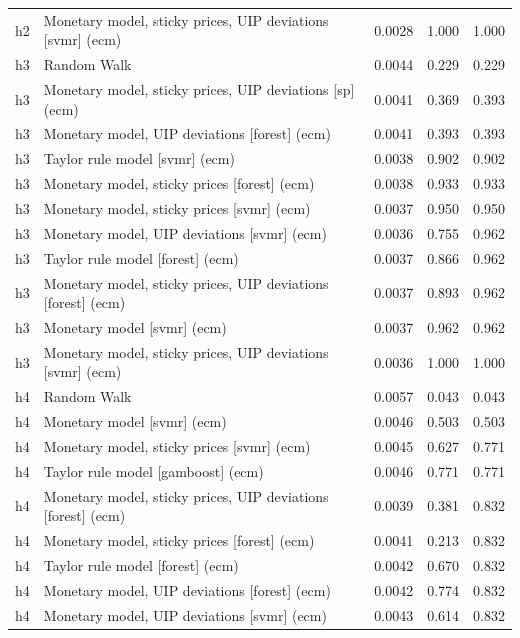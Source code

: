 \begin{ThreePartTable}
\begin{longtable}[t]{cp{5.5cm}ccc}
h2 & \raggedright Monetary model, sticky prices, UIP deviations [svmr] (ecm) & 0.0028 & 1.000 & 1.000\\
\addlinespace
h3 & \raggedright Random Walk & 0.0044 & 0.229 & 0.229\\
h3 & \raggedright Monetary model, sticky prices, UIP deviations [sp] (ecm) & 0.0041 & 0.369 & 0.393\\
h3 & \raggedright Monetary model, UIP deviations [forest] (ecm) & 0.0041 & 0.393 & 0.393\\
h3 & \raggedright Taylor rule model [svmr] (ecm) & 0.0038 & 0.902 & 0.902\\
h3 & \raggedright Monetary model, sticky prices [forest] (ecm) & 0.0038 & 0.933 & 0.933\\
h3 & \raggedright Monetary model, sticky prices [svmr] (ecm) & 0.0037 & 0.950 & 0.950\\
h3 & \raggedright Monetary model, UIP deviations [svmr] (ecm) & 0.0036 & 0.755 & 0.962\\
h3 & \raggedright Taylor rule model [forest] (ecm) & 0.0037 & 0.866 & 0.962\\
h3 & \raggedright Monetary model, sticky prices, UIP deviations [forest] (ecm) & 0.0037 & 0.893 & 0.962\\
h3 & \raggedright Monetary model [svmr] (ecm) & 0.0037 & 0.962 & 0.962\\
h3 & \raggedright Monetary model, sticky prices, UIP deviations [svmr] (ecm) & 0.0036 & 1.000 & 1.000\\
\addlinespace
h4 & \raggedright Random Walk & 0.0057 & 0.043 & 0.043\\
h4 & \raggedright Monetary model [svmr] (ecm) & 0.0046 & 0.503 & 0.503\\
h4 & \raggedright Monetary model, sticky prices [svmr] (ecm) & 0.0045 & 0.627 & 0.771\\
h4 & \raggedright Taylor rule model [gamboost] (ecm) & 0.0046 & 0.771 & 0.771\\
h4 & \raggedright Monetary model, sticky prices, UIP deviations [forest] (ecm) & 0.0039 & 0.381 & 0.832\\
h4 & \raggedright Monetary model, sticky prices [forest] (ecm) & 0.0041 & 0.213 & 0.832\\
h4 & \raggedright Taylor rule model [forest] (ecm) & 0.0042 & 0.670 & 0.832\\
h4 & \raggedright Monetary model, UIP deviations [forest] (ecm) & 0.0042 & 0.774 & 0.832\\
h4 & \raggedright Monetary model, UIP deviations [svmr] (ecm) & 0.0043 & 0.614 & 0.832\\

\end{longtable}
\end{ThreePartTable}
